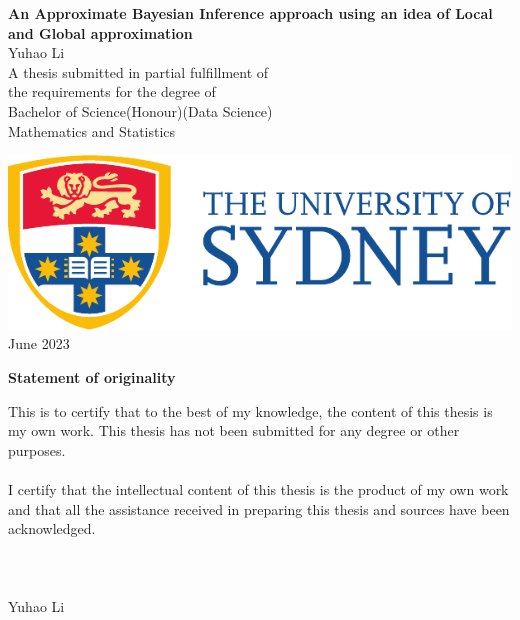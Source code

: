 \begin{titlepage}
\centering
{}
\vspace*{\fill}
\huge{\textbf{{\bf\Huge An Approximate Bayesian Inference approach using an idea of Local and Global approximation}}}\\



\vspace{2.5cm}
\LARGE{Yuhao Li}\\
\vspace{1.5cm}
\large{A thesis submitted in partial fulfillment of \\ the requirements for the degree of \\  Bachelor of Science(Honour)(Data Science)} \\
\vspace{1cm}
\large{Mathematics and Statistics}\\
\vspace{1.5cm}
\date{September 2021}
    \includegraphics[scale=0.75]{UsydLogo.pdf}\\
\vspace{1.5cm}
\large{June 2023}\\
\vspace*{\fill}

\thispagestyle{empty}
\end{titlepage}



\pagebreak
\hspace{0pt}
\begin{center}
    \textbf{\large Statement of originality}\\
    \vspace{0.5cm}
\end{center}

\noindent This is to certify that to the best of my knowledge, the content of this thesis is my own work. This thesis has not been submitted for any degree or other purposes.\\
\\
\noindent I certify that the intellectual content of this thesis is the product of my own work and that all the assistance received in preparing this thesis and sources have been acknowledged.\\
\\
\\
\\
Yuhao Li

